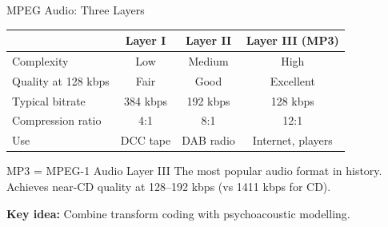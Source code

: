 \documentclass[aspectratio=169,12pt]{beamer}
\begin{document}
\begin{frame}{MPEG Audio: Three Layers}
    \begin{center}
        \begin{tabular}{l|c|c|c}
            \toprule
            & \textbf{Layer I} & \textbf{Layer II} & \textbf{Layer III (MP3)} \\
            \midrule
            Complexity & Low & Medium & High \\
            Quality at 128 kbps & Fair & Good & Excellent \\
            Typical bitrate & 384 kbps & 192 kbps & 128 kbps \\
            Compression ratio & 4:1 & 8:1 & 12:1 \\
            Use & DCC tape & DAB radio & Internet, players \\
            \bottomrule
        \end{tabular}
    \end{center}
    
    \vspace{0.3cm}
    \begin{block}{MP3 = MPEG-1 Audio Layer III}
        The most popular audio format in history. Achieves near-CD quality at 128--192 kbps (vs 1411 kbps for CD).
        
        \textbf{Key idea:} Combine transform coding with psychoacoustic modelling.
    \end{block}
\end{frame}
\end{document}
